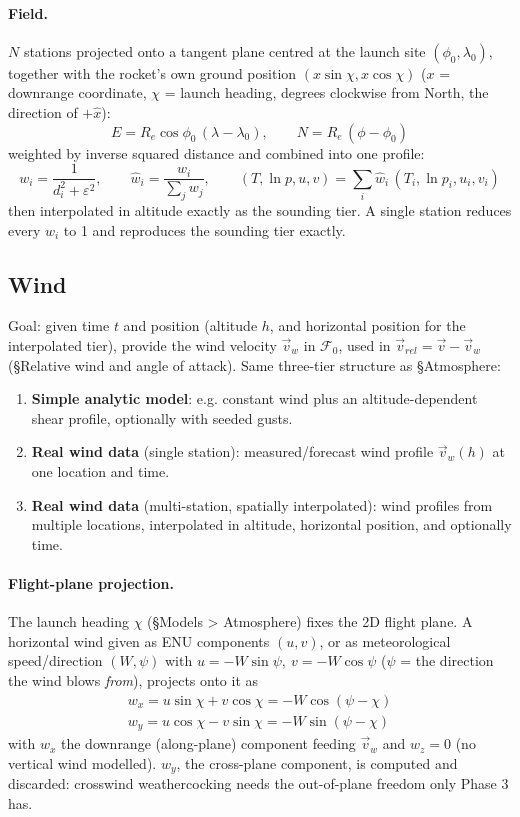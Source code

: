 \documentclass[10pt]{extarticle}
\numberwithin{equation}{subsubsection}
\begin{document}
\paragraph{Field.} $N$ stations projected onto a tangent plane centred at the launch site
$(\phi_0,\lambda_0)$, together with the rocket's own ground position $(x\sin\chi, x\cos\chi)$
($x$ = downrange coordinate, $\chi$ = launch heading, degrees clockwise from North, the direction
of $+\hat{x}$):
\begin{equation}
    E = R_e\cos\phi_0\,(\lambda-\lambda_0), \qquad N = R_e\,(\phi-\phi_0)
\end{equation}
weighted by inverse squared distance and combined into one profile:
\begin{equation}
    w_i = \frac{1}{d_i^2+\varepsilon^2}, \qquad \hat{w}_i = \frac{w_i}{\sum_j w_j}, \qquad
    (T, \ln p, u, v) = \sum_i \hat{w}_i\,(T_i, \ln p_i, u_i, v_i)
\end{equation}
then interpolated in altitude exactly as the sounding tier. A single station reduces every
$\hat{w}_i$ to 1 and reproduces the sounding tier exactly.

\subsection{Wind}
Goal: given time $t$ and position (altitude $h$, and horizontal position for the interpolated
tier), provide the wind velocity $\vec{v}_w$ in $\mathcal{F}_0$, used in
$\vec{v}_{rel} = \vec{v} - \vec{v}_w$ (\S Relative wind and angle of attack). Same three-tier
structure as \S Atmosphere:
\begin{enumerate}
    \item \textbf{Simple analytic model}: e.g. constant wind plus an altitude-dependent shear
    profile, optionally with seeded gusts.
    \item \textbf{Real wind data} (single station): measured/forecast wind profile $\vec{v}_w(h)$
    at one location and time.
    \item \textbf{Real wind data} (multi-station, spatially interpolated): wind profiles from
    multiple locations, interpolated in altitude, horizontal position, and optionally time.
\end{enumerate}

\paragraph{Flight-plane projection.} The launch heading $\chi$ (\S Models > Atmosphere) fixes the
2D flight plane. A horizontal wind given as ENU components $(u,v)$, or as meteorological
speed/direction $(W,\psi)$ with $u=-W\sin\psi,\ v=-W\cos\psi$ ($\psi$ = the direction the wind
blows \emph{from}), projects onto it as
\begin{gather}
    w_x = u\sin\chi + v\cos\chi = -W\cos(\psi-\chi) \\
    w_y = u\cos\chi - v\sin\chi = -W\sin(\psi-\chi)
\end{gather}
with $w_x$ the downrange (along-plane) component feeding $\vec{v}_w$ and $w_z = 0$ (no vertical
wind modelled). $w_y$, the cross-plane component, is computed and discarded: crosswind
weathercocking needs the out-of-plane freedom only Phase 3 has.
\end{document}
